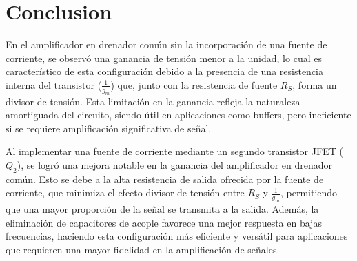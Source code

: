 \documentclass[journal]{IEEEtran}
\begin{document}
	\section{Conclusion}
	\par En el amplificador en drenador común sin la incorporación de una fuente de corriente, se observó una ganancia de tensión menor a la unidad, lo cual es característico de esta configuración debido a la presencia de una resistencia interna del transistor ($\frac{1}{g_m}$) que, junto con la resistencia de fuente $R_S$, forma un divisor de tensión. Esta limitación en la ganancia refleja la naturaleza amortiguada del circuito, siendo útil en aplicaciones como buffers, pero ineficiente si se requiere amplificación significativa de señal.
	\par Al implementar una fuente de corriente mediante un segundo transistor JFET ($Q_2$), se logró una mejora notable en la ganancia del amplificador en drenador común. Esto se debe a la alta resistencia de salida ofrecida por la fuente de corriente, que minimiza el efecto divisor de tensión entre $R_S$ y $\frac{1}{g_m}$, permitiendo que una mayor proporción de la señal se transmita a la salida. Además, la eliminación de capacitores de acople favorece una mejor respuesta en bajas frecuencias, haciendo esta configuración más eficiente y versátil para aplicaciones que requieren una mayor fidelidad en la amplificación de señales.
	
	
	\appendices
\end{document}
